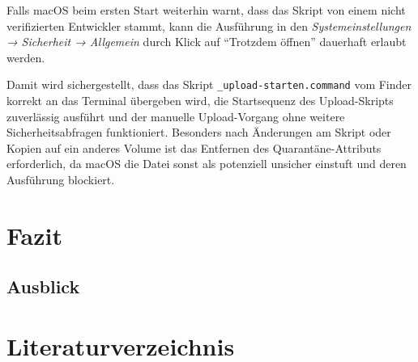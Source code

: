 \documentclass[12pt,a4paper]{report}
\begin{document}
    Falls macOS beim ersten Start weiterhin warnt, dass das Skript von einem nicht verifizierten Entwickler stammt,  
    kann die Ausführung in den \emph{Systemeinstellungen → Sicherheit → Allgemein} durch Klick auf 
    \enquote{Trotzdem öffnen} dauerhaft erlaubt werden.  

    Damit wird sichergestellt, dass das Skript \texttt{\_upload-starten.command} vom Finder korrekt an das Terminal übergeben wird, 
    die Startsequenz des Upload-Skripts zuverlässig ausführt und der manuelle Upload-Vorgang ohne weitere Sicherheitsabfragen funktioniert.  
    Besonders nach Änderungen am Skript oder Kopien auf ein anderes Volume ist das Entfernen des Quarantäne-Attributs erforderlich, 
    da macOS die Datei sonst als potenziell unsicher einstuft und deren Ausführung blockiert.

   
\chapter*{Fazit}
\setcounter{section}{0}

\section{Ausblick}


\cleardoublepage
\chapter*{Literaturverzeichnis}
\printbibliography[heading=none]
\end{document}
